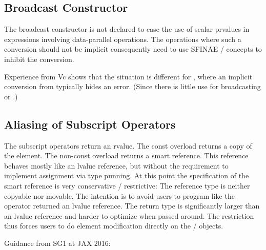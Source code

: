 \subsection{Broadcast Constructor}
The \simd broadcast constructor is not declared  to ease the use of scalar prvalues in expressions involving data-parallel operations.
The operations where such a conversion should not be implicit consequently need to use SFINAE / concepts to inhibit the conversion.

Experience from Vc shows that the situation is different for \mask, where an implicit conversion from \bool typically hides an error.
(Since there is little use for broadcasting \true or \false.)

\subsection{Aliasing of Subscript Operators}
The subscript operators return an rvalue.
The const overload returns a copy of the element.
The non-const overload returns a smart reference.
This reference behaves mostly like an lvalue reference, but without the requirement to implement assignment via type punning.
At this point the specification of the smart reference is very conservative / restrictive:
The reference type is neither copyable nor movable.
The intention is to avoid users to program like the operator returned an lvalue reference.
The return type is significantly larger than an lvalue reference and harder to optimize when passed around.
The restriction thus forces users to do element modification directly on the \simd / \mask objects.

Guidance from SG1 at JAX 2016:\\


